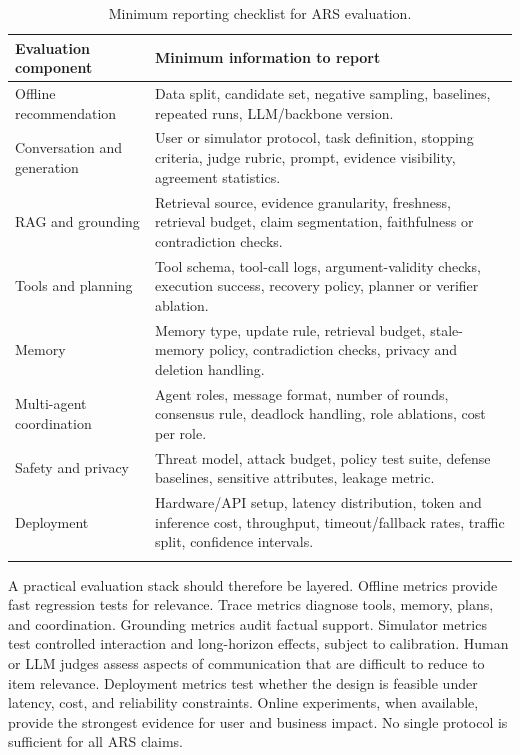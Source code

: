 \begin{table}[!t]
\centering
\footnotesize
\setlength{\tabcolsep}{4pt}
\renewcommand{\arraystretch}{1.08}
\caption{Minimum reporting checklist for ARS evaluation.}
\vspace{-8pt}
\label{tab:ars-reporting-checklist}
\begin{tabularx}{\textwidth}{@{}p{}L@{}}
\toprule
\textbf{Evaluation component} & \textbf{Minimum information to report} \\
\midrule
Offline recommendation & Data split, candidate set, negative sampling, baselines, repeated runs, LLM/backbone version. \\
Conversation and generation & User or simulator protocol, task definition, stopping criteria, judge rubric, prompt, evidence visibility, agreement statistics. \\
RAG and grounding & Retrieval source, evidence granularity, freshness, retrieval budget, claim segmentation, faithfulness or contradiction checks. \\
Tools and planning & Tool schema, tool-call logs, argument-validity checks, execution success, recovery policy, planner or verifier ablation. \\
Memory & Memory type, update rule, retrieval budget, stale-memory policy, contradiction checks, privacy and deletion handling. \\
Multi-agent coordination & Agent roles, message format, number of rounds, consensus rule, deadlock handling, role ablations, cost per role. \\
Safety and privacy & Threat model, attack budget, policy test suite, defense baselines, sensitive attributes, leakage metric. \\
Deployment & Hardware/API setup, latency distribution, token and inference cost, throughput, timeout/fallback rates, traffic split, confidence intervals. \\
\bottomrule
\vspace{-15pt}
\end{tabularx}
\end{table}



A practical evaluation stack should therefore be layered. Offline metrics provide fast regression tests for relevance. Trace metrics diagnose tools, memory, plans, and coordination. Grounding metrics audit factual support. Simulator metrics test controlled interaction and long-horizon effects, subject to calibration. Human or LLM judges assess aspects of communication that are difficult to reduce to item relevance. Deployment metrics test whether the design is feasible under latency, cost, and reliability constraints. Online experiments, when available, provide the strongest evidence for user and business impact. No single protocol is sufficient for all ARS claims.



